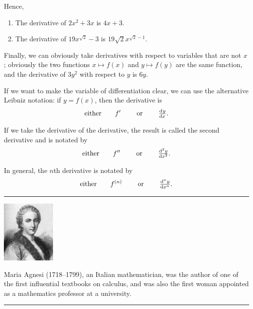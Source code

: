 Hence,
\begin{ex}\leavevmode
  \begin{enumerate}
    \item The derivative of $ 2x^2 + 3x $ is $ 4x + 3 $.
    \item The derivative of $ 19x^{\sqrt{2}} - 3 $ is $ 19\sqrt{2}x^{\sqrt{2} - 1} $.
  \end{enumerate}
\end{ex}

Finally, we can obviously take derivatives with respect to variables that are not $ x $;
obviously the two functions $ x \mapsto f(x) $ and $ y \mapsto f(y) $ are the same function,
and the derivative of $ 3y^2 $ with respect to $ y $ is $ 6y $.

If we want to make the variable of differentiation clear, we can use the alternative Leibniz
notation: if $ y = f(x) $, then the derivative is
\begin{displaymath}
  \text{either} \qquad f' \qquad\text{ or }\qquad \od{y}{x}.
\end{displaymath}

If we take the derivative of the derivative, the result is called the second derivative and
is notated by
\begin{displaymath}
  \text{either} \qquad f'' \qquad\text{ or }\qquad \od[2]{y}{x}.
\end{displaymath}

In general, the $n$th derivative is notated by
\begin{displaymath}
  \text{either} \qquad f^{(n)} \qquad\text{ or }\qquad \od[n]{y}{x}.
\end{displaymath}


\begin{center}\noindent\rule{8cm}{0.4pt}\end{center}
  \begin{center}
    \includegraphics[width=0.2\textwidth]{agnesi}
  \end{center}
  Maria Agnesi (1718--1799), an Italian mathematician, was the author of one of the
  first influential textbooks on calculus, and was also the first woman appointed as
  a mathematics professor at a university.
\begin{center}\noindent\rule{8cm}{0.4pt}\end{center}

